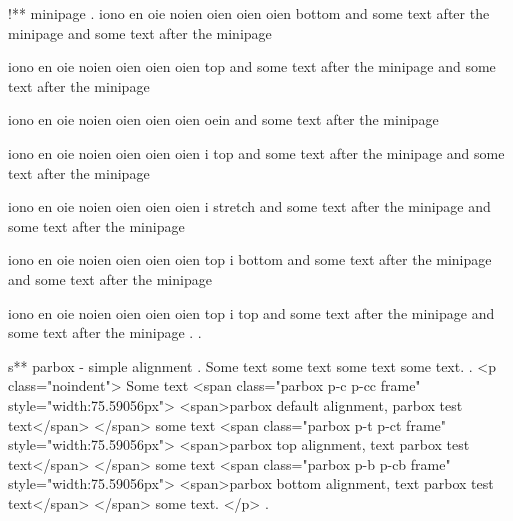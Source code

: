 !** minipage
.
iono en oie noien oien oien oien bottom  and some text after the minipage and some text after the minipage

iono en oie noien oien oien oien top  and some text after the minipage and some text after the minipage


iono en oie noien oien oien oien oein  and some text after the minipage

iono en oie noien oien oien oien i top  and some text after the minipage and some text after the minipage

iono en oie noien oien oien oien i stretch  and some text after the minipage and some text after the minipage

iono en oie noien oien oien oien top i bottom  and some text after the minipage and some text after the minipage

iono en oie noien oien oien oien top i top  and some text after the minipage and some text after the minipage
.
.


s** parbox - simple alignment
.
\noindent
Some text
some text
some text
some text.
.
<p class="noindent">
Some text <span class="parbox p-c p-cc frame" style="width:75.59056px">
<span>parbox default alignment, parbox test text</span>
</span> some text <span class="parbox p-t p-ct frame" style="width:75.59056px">
<span>parbox top alignment, text parbox test text</span>
</span> some text <span class="parbox p-b p-cb frame" style="width:75.59056px">
<span>parbox bottom alignment, text parbox test text</span>
</span> some text.
</p>
.


